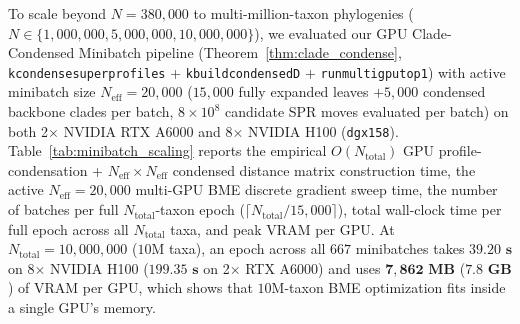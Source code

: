 \documentclass[11pt,a4paper]{article}
\makeatletter
\DeclareRobustCommand{\_}{\ifmmode\nfss@text{\textunderscore}\else\textunderscore\allowbreak\fi}
\theoremstyle{definition}
\makeatother
\begin{document}
To scale beyond $N = 380{,}000$ to multi-million-taxon phylogenies ($N \in \{1{,}000{,}000, 5{,}000{,}000, 10{,}000{,}000\}$), we evaluated our GPU Clade-Condensed Minibatch pipeline (Theorem~\ref{thm:clade_condense}, \texttt{k\_condense\_super\_profiles} + \texttt{k\_build\_condensed\_D} + \texttt{run\_multi\_gpu\_top1}) with active minibatch size $N_{\text{eff}} = 20{,}000$ ($15{,}000$ fully expanded leaves $+ 5{,}000$ condensed backbone clades per batch, $8 \times 10^8$ candidate SPR moves evaluated per batch) on both 2$\times$ NVIDIA RTX A6000 and 8$\times$ NVIDIA H100 (\texttt{dgx158}). Table~\ref{tab:minibatch_scaling} reports the empirical $O(N_{\text{total}})$ GPU profile-condensation + $N_{\text{eff}} \times N_{\text{eff}}$ condensed distance matrix construction time, the active $N_{\text{eff}} = 20{,}000$ multi-GPU BME discrete gradient sweep time, the number of batches per full $N_{\text{total}}$-taxon epoch ($\lceil N_{\text{total}} / 15{,}000 \rceil$), total wall-clock time per full epoch across all $N_{\text{total}}$ taxa, and peak VRAM per GPU. At $N_{\text{total}} = 10{,}000{,}000$ ($10\text{M}$ taxa), an epoch across all $667$ minibatches takes $\mathbf{39.20\text{ s}}$ on 8$\times$ NVIDIA H100 ($\mathbf{199.35\text{ s}}$ on 2$\times$ RTX A6000) and uses $\mathbf{7{,}862\text{ MB}}$ ($\mathbf{7.8\text{ GB}}$) of VRAM per GPU, which shows that $10\text{M}$-taxon BME optimization fits inside a single GPU's memory.

\begin{table}[h!]
\centering
\caption{Clade-Condensed Minibatch Scaling at $N_{\text{total}} = 1{,}000{,}000 \dots 10{,}000{,}000$ Taxa ($N_{\text{eff}} = 20{,}000$) on 2$\times$ NVIDIA RTX A6000 and 8$\times$ NVIDIA H100 (\texttt{dgx158}).}
\label{tab:minibatch_scaling}
\vspace{4pt}
\end{table}
\end{document}
